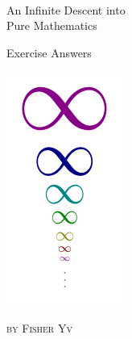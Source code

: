 
$ $

\vfill

\begin{center}
\thispagestyle{empty}

{\Huge \mdseries {}\selectfont
An Infinite Descent into\\
Pure Mathematics}

{\Large \mdseries {}\selectfont
Exercise Answers
}

\vfill
\includegraphics{book/media/logo.pdf}

\vfill


\textsc{by Fisher Yv}\\

\vfill


\end{center}
